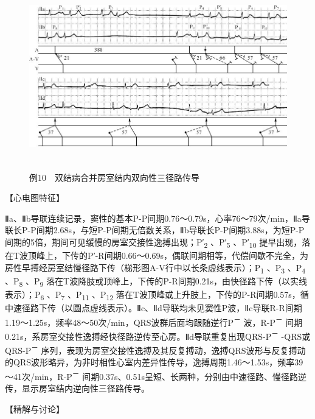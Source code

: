 \begin{figure}[!htbp]
 \centering
 \includegraphics[width=5.79167in,height=3.17708in]{./images/Image00768.jpg}
 \captionsetup{justification=centering}
 \caption{例10　双结病合并房室结内双向性三径路传导}
 \label{fig50-10}
  \end{figure} 

【心电图特征】

Ⅱa、Ⅱb导联连续记录，窦性的基本P-P间期0.76～0.79s，心率76～79次/min，Ⅱa导联长P-P间期2.68s，与短P-P间期无倍数关系，Ⅱb导联长P-P间期3.88s，为短P-P间期的5倍，期间可见缓慢的房室交接性逸搏出现；P′\textsubscript{2}
、P′\textsubscript{5} 、P′\textsubscript{10}
提早出现，落在T波顶峰上，下传的P′-R间期0.66～0.69s，偶联间期相等，代偿间歇不完全，为房性早搏经房室结慢径路下传（梯形图A-V行中以长条虚线表示）；P\textsubscript{1}
、P\textsubscript{3} 、P\textsubscript{4} 、P\textsubscript{8}
、P\textsubscript{9}
落在T波降肢或顶峰上，下传的P-R间期0.21s，由快径路下传（以实线表示）；P\textsubscript{6}
、P\textsubscript{7} 、P\textsubscript{11} 、P\textsubscript{12}
落在T波顶峰或上升肢上，下传的P-R间期0.57s，循中速径路下传（以圆点虚线表示）。Ⅱc、Ⅱd导联均未见窦性P波，Ⅱc导联R-R间期1.19～1.25s，频率48～50次/min，QRS波群后面均跟随逆行P\textsuperscript{－}
波，R-P\textsuperscript{－}
间期0.21s，系房室交接性逸搏经快径路逆传至心房。Ⅱd导联重复出现QRS-P\textsuperscript{－}
-QRS或QRS-P\textsuperscript{－}
序列，表现为房室交接性逸搏及其反复搏动，逸搏QRS波形与反复搏动的QRS波形略异，为非时相性心室内差异性传导，逸搏周期1.46～1.53s，频率39～41次/min，R-P\textsuperscript{－}
间期0.37s、0.51s呈短、长两种，分别由中速径路、慢径路逆传，显示房室结内逆向性三径路传导。

【精解与讨论】

